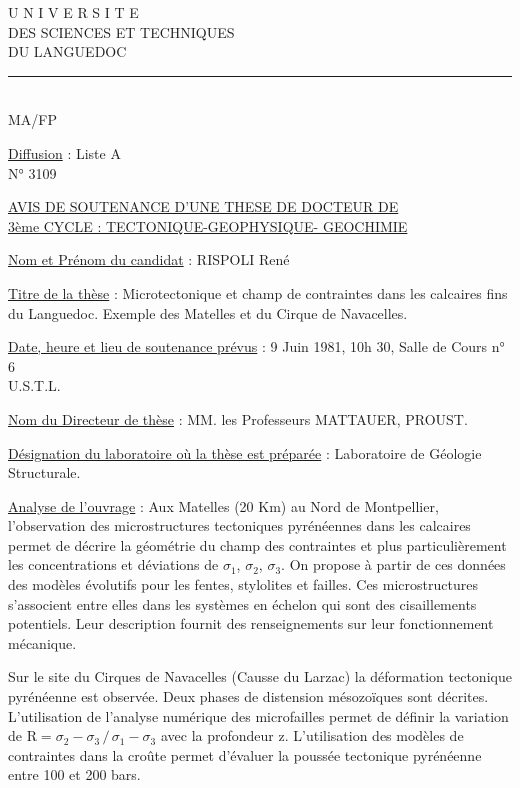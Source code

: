 
\begin{center}
U N I V E R S I T E\\
DES SCIENCES ET TECHNIQUES\\
DU LANGUEDOC\\
\rule{2.8cm}{.4pt}\\
MA/FP
\end{center}
\uline{Diffusion} : Liste A\\
N° 3109

\begin{center}
\uline{AVIS DE SOUTENANCE D'UNE THESE DE DOCTEUR DE}\\
\uline{3ème CYCLE : TECTONIQUE-GEOPHYSIQUE- GEOCHIMIE}
\end{center}

\uline{Nom et Prénom du candidat} : RISPOLI René

\uline{Titre de la thèse} : Microtectonique et champ de contraintes dans les calcaires fins du Languedoc. Exemple des Matelles et du Cirque de Navacelles.

\uline{Date, heure et lieu de soutenance prévus} : 9 Juin 1981, 10h 30, Salle de Cours n° 6\\
U.S.T.L.

\uline{Nom du Directeur de thèse} : MM. les Professeurs MATTAUER, PROUST.

\uline{Désignation du laboratoire où la thèse est préparée} : Laboratoire de Géologie Structurale.

\uline{Analyse de l'ouvrage} : Aux Matelles (20 Km) au Nord de Montpellier, l'observation des microstructures tectoniques pyrénéennes dans les calcaires permet de décrire la géométrie du champ des contraintes et plus particulièrement les concentrations et déviations de $\sigma_1$, $\sigma_2$, $\sigma_3$. On propose à partir de ces données des modèles évolutifs pour les fentes, stylolites et failles. Ces microstructures s'associent entre elles dans les systèmes en échelon qui sont des cisaillements potentiels. Leur description fournit des renseignements sur leur fonctionnement mécanique.

Sur le site du Cirques de Navacelles (Causse du Larzac) la déformation tectonique pyrénéenne est observée. Deux phases de distension mésozoïques sont décrites. L'utilisation de l'analyse numérique des microfailles permet de définir la variation de $\mathrm R=\sigma_2-\sigma_3\,/\,\sigma_1-\sigma_3$ avec la profondeur z. L'utilisation des modèles de contraintes dans la croûte permet d'évaluer la poussée tectonique pyrénéenne entre 100 et 200 bars.


